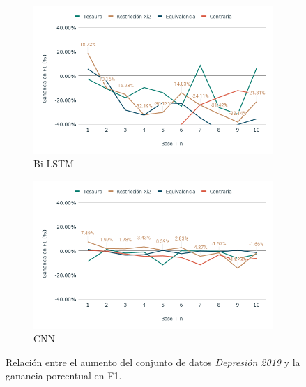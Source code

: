 \begin{figure}[hbt!]
    \begin{subfigure}[b]{0.5\textwidth}
        \includegraphics[width=\textwidth]{sections/figures/bi_LSTM2019.png}
        \caption{Bi-LSTM}
    \end{subfigure}
    \hfill
    \begin{subfigure}[b]{0.5\textwidth}
        \includegraphics[width=\textwidth]{sections/figures/CNN2019.png}
        \caption{CNN}
    \end{subfigure}
    

   
    \caption{Relación entre el aumento del conjunto de datos \textit{Depresión 2019} y la ganancia porcentual en F1.}
    \label{fig:aumento_n_depresion19}
\end{figure}
